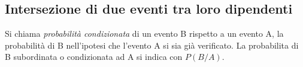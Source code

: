 \vspazio{}

\subsection{Intersezione di due eventi tra loro dipendenti}
\begin{definizione}
Si chiama \emph{probabilità condizionata} di un evento B rispetto a un evento A, la probabilità di B nell'ipotesi che l'evento A si sia già verificato. La probabilita di B subordinata o condizionata ad A si indica con $P(B/A)$.
\end{definizione}

